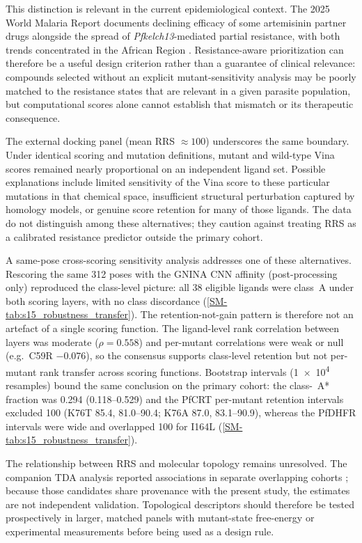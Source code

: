 \documentclass[journal=jcisd8,manuscript=article,layout=traditional]{achemso}
\begin{document}
This distinction is relevant in the current epidemiological context. The 2025 World Malaria Report documents declining efficacy of some artemisinin partner drugs alongside the spread of \textit{Pfkelch13}-mediated partial resistance, with both trends concentrated in the African Region \citep{who_malaria_2025}. Resistance-aware prioritization can therefore be a useful design criterion rather than a guarantee of clinical relevance: compounds selected without an explicit mutant-sensitivity analysis may be poorly matched to the resistance states that are relevant in a given parasite population, but computational scores alone cannot establish that mismatch or its therapeutic consequence.

The external docking panel (mean RRS $\approx\num{100}$) underscores the same boundary. Under identical scoring and mutation definitions, mutant and wild-type Vina scores remained nearly proportional on an independent ligand set. Possible explanations include limited sensitivity of the Vina score to these particular mutations in that chemical space, insufficient structural perturbation captured by homology models, or genuine score retention for many of those ligands. The data do not distinguish among these alternatives; they caution against treating RRS as a calibrated resistance predictor outside the primary cohort.

A same-pose cross-scoring sensitivity analysis addresses one of these alternatives. Rescoring the same \num{312} poses with the GNINA CNN affinity (post-processing only) reproduced the class-level picture: all \num{38} eligible ligands were class~A under both scoring layers, with no class discordance (\cref{SM-tab:s15_robustness_transfer}). The retention-not-gain pattern is therefore not an artefact of a single scoring function. The ligand-level rank correlation between layers was moderate ($\rho=\num{0.558}$) and per-mutant correlations were weak or null (e.g.\ C59R $-0.076$), so the consensus supports class-level retention but not per-mutant rank transfer across scoring functions. Bootstrap intervals (\num{1e4} resamples) bound the same conclusion on the primary cohort: the class-~A* fraction was \num{0.294} (\numrange{0.118}{0.529}) and the PfCRT per-mutant retention intervals excluded \num{100} (K76T \num{85.4}, \numrange{81.0}{90.4}; K76A \num{87.0}, \numrange{83.1}{90.9}), whereas the PfDHFR intervals were wide and overlapped \num{100} for I164L (\cref{SM-tab:s15_robustness_transfer}).

The relationship between RRS and molecular topology remains unresolved. The companion TDA analysis reported associations in separate overlapping cohorts \citep{temgoua2026quantum}; because those candidates share provenance with the present study, the estimates are not independent validation. Topological descriptors should therefore be tested prospectively in larger, matched panels with mutant-state free-energy or experimental measurements before being used as a design rule.
\end{document}
